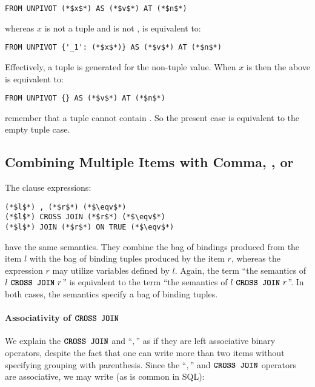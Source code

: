 \begin{lstlisting}
FROM UNPIVOT (*$x$*) AS (*$v$*) AT (*$n$*)
\end{lstlisting}

\noindent whereas $x$ is not a tuple and is not \MISSING, is equivalent to:

\begin{lstlisting}
FROM UNPIVOT {'_1': (*$x$*)} AS (*$v$*) AT (*$n$*)
\end{lstlisting}

\noindent Effectively, a tuple is generated for the non-tuple value.  When $x$ is \MISSING
then the above is equivalent to:

\begin{lstlisting}
FROM UNPIVOT {} AS (*$v$*) AT (*$n$*)
\end{lstlisting}

\noindent remember that a tuple cannot contain \MISSING. So the present case is equivalent to the empty tuple case.

\subsection{Combining Multiple \from Items with Comma, \CROSSJOIN, or \JOIN}
\label{sec:combining-multiple-item-join}

The \from clause expressions:

\begin{lstlisting}
(*$l$*) , (*$r$*) (*$\eqv$*)
(*$l$*) CROSS JOIN (*$r$*) (*$\eqv$*)
(*$l$*) JOIN (*$r$*) ON TRUE (*$\eqv$*)
\end{lstlisting}

\noindent have the same semantics. They combine the bag of bindings produced
from the \from item $l$ with the bag of binding tuples produced by the \from
item $r$, whereas the expression $r$ may utilize variables defined by $l$. Again, the term ``the semantics of $l\ \CROSSJOIN\ r$'' is equivalent
to the term ``the semantics of \from $l\ \CROSSJOIN\ r$''. In both cases, the
semantics specify a bag of binding tuples.

\paragraph{Associativity of $\texttt{\textbf{CROSS JOIN}}$} We explain the $\texttt{\textbf{CROSS JOIN}}$ and
``$,$'' as if they are left associative binary operators, despite the fact that
one can write more than two \from items without specifying grouping with
parenthesis. Since the ``$,$'' and $\texttt{\textbf{CROSS JOIN}}$ operators are associative, we
may write (as is common in SQL):

